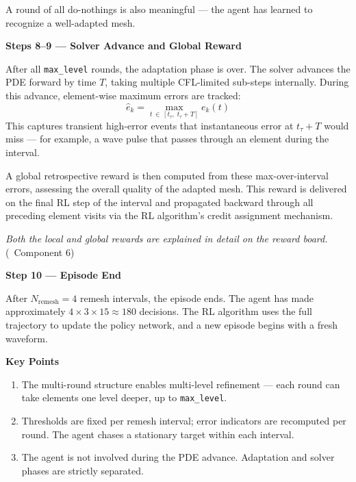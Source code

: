 \documentclass[11pt]{article}
\begin{document}
A round of all do-nothings is also meaningful --- the agent has learned to recognize a well-adapted mesh.

\vspace{0.3cm}

\noindent\textbf{\textcolor{solvercolor}{Steps 8--9 --- Solver Advance and Global Reward}}

After all \texttt{max\_level} rounds, the adaptation phase is over. The solver advances the PDE forward by time $T$, taking multiple CFL-limited sub-steps internally. During this advance, element-wise maximum errors are tracked:
%
\[
\hat{e}_k = \max_{t \,\in\, [t_\tau,\; t_\tau + T]} e_k(t)
\]
%
This captures transient high-error events that instantaneous error at $t_\tau + T$ would miss --- for example, a wave pulse that passes through an element during the interval.

A global retrospective reward is then computed from these max-over-interval errors, assessing the overall quality of the adapted mesh. This reward is delivered on the final RL step of the interval and propagated backward through all preceding element visits via the RL algorithm's credit assignment mechanism.

\textit{Both the local and global rewards are explained in detail on the reward board.} (\textrightarrow~Component 6)

\vspace{0.3cm}

\noindent\textbf{\textcolor{episodecolor}{Step 10 --- Episode End}}

After $N_{\text{remesh}} = 4$ remesh intervals, the episode ends. The agent has made approximately $4 \times 3 \times 15 \approx 180$ decisions. The RL algorithm uses the full trajectory to update the policy network, and a new episode begins with a fresh waveform.

\vspace{0.5cm}

\noindent\textbf{Key Points}

\begin{enumerate}[leftmargin=1.5em, itemsep=3pt]
    \item The multi-round structure enables multi-level refinement --- each round can take elements one level deeper, up to \texttt{max\_level}.
    \item Thresholds are fixed per remesh interval; error indicators are recomputed per round. The agent chases a stationary target within each interval.
    \item The agent is not involved during the PDE advance. Adaptation and solver phases are strictly separated.
\end{enumerate}
\end{document}
